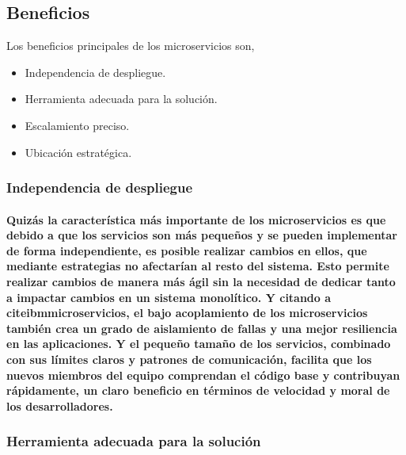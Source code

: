 \subsection{Beneficios}

Los beneficios principales de los microservicios son,
\begin{itemize}
    \item Independencia de despliegue.
    \item Herramienta adecuada para la solución.
    \item Escalamiento preciso.
    \item Ubicación estratégica.
\end{itemize}

\subsubsection{Independencia de despliegue}
\paragraph{
    Quizás la característica más importante de los microservicios es que debido a que los servicios son más pequeños y se pueden implementar de forma independiente, es posible realizar cambios en ellos, que mediante estrategias no afectarían al resto del sistema. Esto permite realizar cambios de manera más ágil sin la necesidad de dedicar tanto a impactar cambios en un sistema monolítico.
    Y citando a cite{ibmmicroservicios}, el bajo acoplamiento de los microservicios también crea un grado de aislamiento de fallas y una mejor resiliencia en las aplicaciones. Y el pequeño tamaño de los servicios, combinado con sus límites claros y patrones de comunicación, facilita que los nuevos miembros del equipo comprendan el código base y contribuyan rápidamente, un claro beneficio en términos de velocidad y moral de los desarrolladores.
}

\subsubsection{Herramienta adecuada para la solución}
